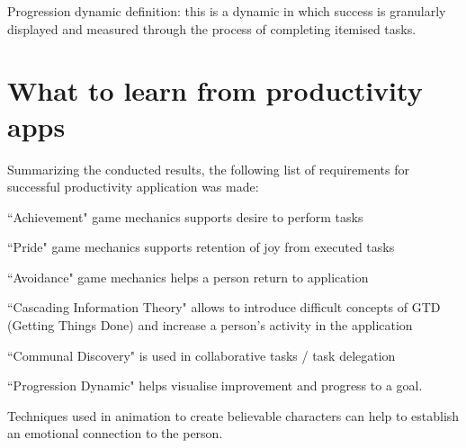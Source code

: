 Progression dynamic definition: this is a dynamic in which success is granularly displayed and measured through the process of completing itemised tasks.

\section{What to learn from productivity apps}

Summarizing the conducted results, the following list of requirements for successful productivity application was made:
\begin{compactitem}
\item ``Achievement" game mechanics supports desire to perform tasks
\item ``Pride" game mechanics supports retention of joy from executed tasks
\item ``Avoidance" game mechanics helps a person return to application
\item ``Cascading Information Theory" allows to introduce difficult concepts of GTD (Getting Things Done) and increase a person’s activity in the application
\item ``Communal Discovery" is used in collaborative tasks / task delegation
\item ``Progression Dynamic" helps visualise improvement and progress to a goal.
\end{compactitem}

Techniques used in animation to create believable characters can help to establish an emotional connection to the person.
